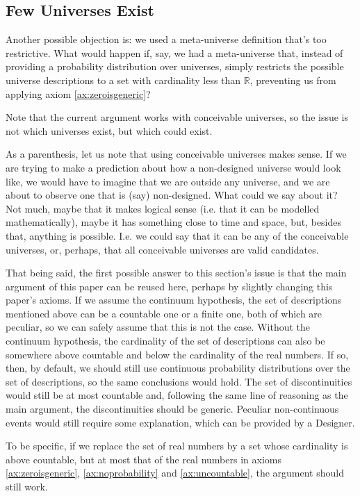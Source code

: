 \documentclass[a4paper
,draft
]{article}
\def\reale{\mathbb{R}}
\newcommand{\paper}[1]{paper}
\begin{document}
\subsection{Few Universes Exist}
\label{sec:fewuniverses}

Another possible objection is: we used a meta-universe definition that's too
restrictive. What would happen if, say, we had a meta-universe that, instead
of providing a probability distribution over universes, simply restricts the
possible universe descriptions to a set with cardinality less than $\reale$,
preventing us from applying axiom \ref{ax:zeroisgeneric}?

Note that the current argument works with conceivable universes, so the issue
is not which universes exist, but which could exist.

As a parenthesis, let us note that using conceivable universes makes sense.
If we are
trying to make a prediction about how a non-designed universe would
look like, we would have to imagine that we are outside any universe, and we are
about to observe one that is (say) non-designed. What could we say about it?
Not much, maybe that it makes logical sense (i.e. that it can be modelled
mathematically), maybe it has something close to time and space, but,
besides that, anything is possible.
I.e. we could say that it can be any
of the conceivable universes, or, perhaps,
that all conceivable universes are valid candidates.

That being said, the first possible answer to this section's issue
is that the main argument of this \paper{} can be reused here,
perhaps by slightly changing this \paper{}'s
axioms.
If we assume the continuum hypothesis, the set of descriptions mentioned
above can be a countable one or a finite one, both of which are peculiar,
so we can safely assume that this is not the case.
Without the continuum hypothesis, the cardinality of the set of descriptions
can also be somewhere above countable and below the cardinality of
the real numbers.
If so, then, by default, we should still use continuous
probability distributions over the set of descriptions, so the same conclusions
would hold.
The set of discontinuities would still be at most countable and,
following the same line of reasoning as the main argument, the discontinuities
should be generic.
Peculiar non-continuous events would still require some explanation,
which can be provided by a Designer.

To be specific, if we replace the set of real numbers by a set whose
cardinality is above countable, but at most that of the real numbers
in axioms \ref{ax:zeroisgeneric}, \ref{ax:noprobability} and
\ref{ax:uncountable}, the argument should still work.
\end{document}
